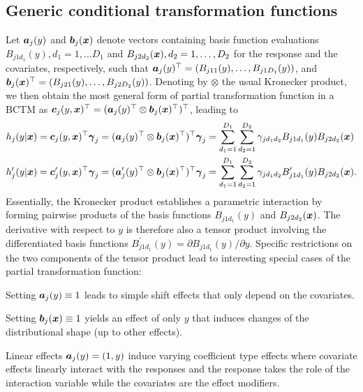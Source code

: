 \documentclass[12pt]{article}
\theoremstyle{plain}
\begin{document}
\subsection{Generic conditional transformation functions}\label{sec:generic_ct}
Let $\text{\boldmath$a$}_j(y)$ and $\text{\boldmath$b$}_j(\text{\boldmath$x$})$ denote vectors containing basis function evaluations $B_{j1d_1}(y), d_1 = 1, \ldots D_1$ and $B_{j2d_2}(\text{\boldmath$x$}), d_2 = 1,\ldots, D_2$ for the response and the covariates, respectively, such that
$\text{\boldmath$a$}_j(y)^\top = (B_{j11}(y),\ldots,B_{j1D_1}(y))$, and $\text{\boldmath$b$}_j(\text{\boldmath$x$})^\top = (B_{j21}(y),\ldots,B_{j2D_2}(y))$.
Denoting by $\otimes$ the usual Kronecker product, we then obtain the most general form of partial transformation function in a BCTM as $\text{\boldmath$c$}_j(y,\text{\boldmath$x$})^\top =  (\text{\boldmath$a$}_j(y)^\top \otimes \text{\boldmath$b$}_j(\text{\boldmath$x$})^\top)^\top$, leading to
\begin{align}
\begin{split}
h_j(y |\text{\boldmath$x$}) &= \text{\boldmath$c$}_j(y, \text{\boldmath$x$})^\top \text{\boldmath$\gamma$}_j = (\text{\boldmath$a$}_j(y)^\top \otimes \text{\boldmath$b$}_j(\text{\boldmath$x$})^\top)^\top \text{\boldmath$\gamma$}_j = \sum_{d_1=1}^{D_1} \sum_{d_2=1}^{D_2} \gamma_{jd_1d_2} B_{j1d_1}(y)B_{j2d_2}(\text{\boldmath$x$})\\
h^\prime_j(y |\text{\boldmath$x$}) &= \text{\boldmath$c$}^\prime_j(y, \text{\boldmath$x$})^\top \text{\boldmath$\gamma$}_j = (\text{\boldmath$a$}_j^\prime(y)^\top \otimes \text{\boldmath$b$}_j(\text{\boldmath$x$})^\top)^\top \text{\boldmath$\gamma$}_j = \sum_{d_1=1}^{D_1} \sum_{d_2=1}^{D_2} \gamma_{jd_1d_2} B^\prime_{j1d_1}(y)B_{j2d_2}(\text{\boldmath$x$}).
\end{split}\label{full_bctm}
\end{align}
Essentially, the Kronecker product establishes a parametric interaction by forming pairwise products of the basis functions $B_{j1d_1}(y)$ and $B_{j2d_2}(\text{\boldmath$x$})$. The derivative with respect to $y$ is therefore also a tensor product involving the differentiated basis functions $B^\prime_{j1d_1}(y)=\partial B_{j1d_1}(y)/\partial y $. Specific restrictions on the two components of the tensor product lead to interesting special cases of the partial transformation function:
\begin{compactitem}
    \item Setting $\text{\boldmath$a$}_j(y)\equiv1$ leads to simple shift effects that only depend on the covariates.
    \item Setting $\text{\boldmath$b$}_j(\text{\boldmath$x$})\equiv1$ yields an effect of only $y$ that induces changes of the distributional shape (up to other effects).
    \item Linear effects $\text{\boldmath$a$}_j(y)=(1,y)$ induce varying coefficient type effects where covariate effects linearly interact with the responses and  the response takes the role of the interaction variable while the covariates are the effect modifiers.
\end{compactitem}
\end{document}
